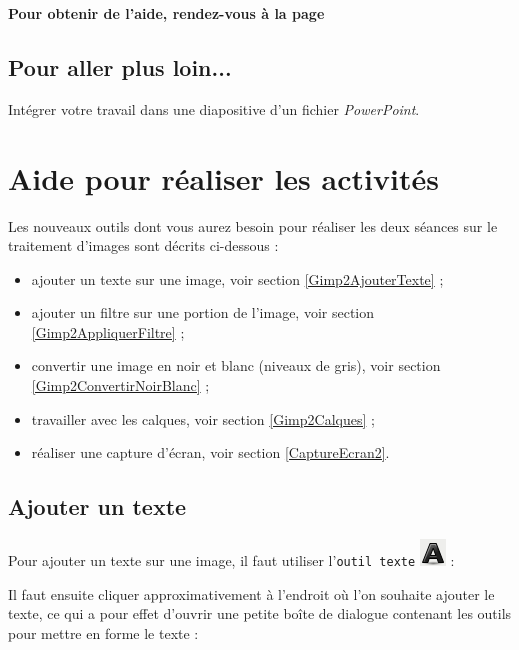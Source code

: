 \textbf{Pour obtenir de l'aide, rendez-vous à la page \pageref{Image5eOutils}}

\subsection{Pour aller plus loin...}

Intégrer votre travail dans une diapositive d'un fichier \emph{PowerPoint}.


\newpage

\section{Aide pour réaliser les activités}\label{Image5eOutils}
 
Les nouveaux outils dont vous aurez besoin pour réaliser les deux séances sur le traitement d'images sont décrits ci-dessous :

\begin{itemize}   
\item ajouter un texte sur une image, voir section \vref{Gimp2AjouterTexte} ;
\item ajouter un filtre sur une portion de l'image, voir section \vref{Gimp2AppliquerFiltre} ;
\item convertir une image en noir et blanc (niveaux de gris), voir section \vref{Gimp2ConvertirNoirBlanc} ;
\item travailler avec les calques, voir section \vref{Gimp2Calques} ;   
\item réaliser une capture d'écran, voir section \vref{CaptureEcran2}.
\end{itemize}  



\subsection{Ajouter un texte}\label{Gimp2AjouterTexte}

Pour ajouter un texte sur une image, il faut utiliser l'\texttt{outil texte} \includegraphics[width=.6cm]{./images/image02/iconeTexte} :


Il faut ensuite cliquer approximativement à l'endroit où l'on souhaite ajouter le texte, ce qui a pour effet d'ouvrir une petite boîte de dialogue contenant les outils pour mettre en forme le texte :

